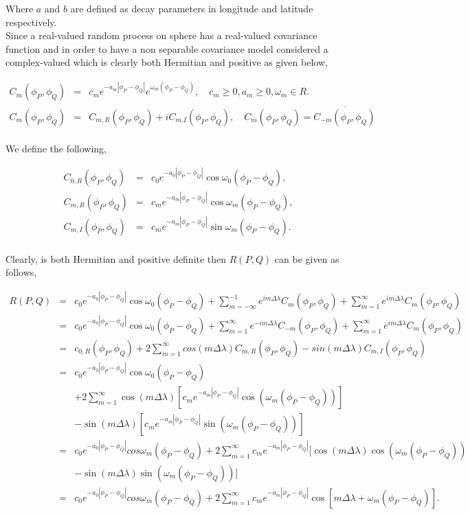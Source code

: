 	Where $a$ and $b$ are defined as decay parameters in longitude and latitude respectively. \\ 
		
	Since a real-valued random process on sphere has a real-valued covariance function and in order to have a non separable covariance model \cite{Huang2012} considered a complex-valued \Cm which is clearly both Hermitian and positive as given below,
		
	\begin{eqnarray*}
		C_m(\phi_P,\phi_Q) &=& c_m e^{-a_m|\phi_P-\phi_Q|}e^{\omega_m(\phi_P-\phi_Q)}, \quad c_m \ge 0,a_m\ge0,\omega_m\in R. \\
		C_m(\phi_P,\phi_Q) &=& C_{m,R}(\phi_P,\phi_Q)+iC_{m.I}(\phi_P,\phi_Q), \quad C_m(\phi_P,\phi_Q) = \overline{C_{-m}(\phi_P,\phi_Q)} 
	\end{eqnarray*}\\
		
	We define the following, 
	
	\begin{eqnarray*}
		C_{0,R}(\phi_P,\phi_Q) &=& c_0e^{-a_0|\phi_P-\phi_Q|}\cos\omega_0(\phi_P-\phi_Q), \\
		C_{m,R}(\phi_P,\phi_Q) &=& c_me^{-a_m|\phi_P-\phi_Q|}\cos\omega_m(\phi_P-\phi_Q), \\
		C_{m,I}(\phi_P,\phi_Q) &=& c_me^{-a_m|\phi_P-\phi_Q|}\sin\omega_m(\phi_P-\phi_Q). \\
	\end{eqnarray*}
	
	Clearly, \Cm is both Hermitian and positive definite then $R(P,Q)$ can be given as follows,
		
	\begin{eqnarray*}
		R(P,Q) &=& c_0e^{-a_0|\phi_P-\phi_Q|}\cos\omega_0(\phi_P-\phi_Q) + \sum_{m=-\infty}^{-1} e^{im\Delta\lambda}C_m(\phi_P,\phi_Q) + \sum_{m=1}^{\infty} e^{im\Delta\lambda}C_m(\phi_P,\phi_Q) \\
		&=& c_0e^{-a_0|\phi_P-\phi_Q|}\cos\omega_0(\phi_P-\phi_Q) + \sum_{m=1}^{\infty} e^{-im\Delta\lambda}C_{-m}(\phi_P,\phi_Q) + \sum_{m=1}^{\infty} e^{im\Delta\lambda}C_m(\phi_P,\phi_Q) \\
		&=& c_{0,R}(\phi_P,\phi_Q)+2 \sum_{m=1}^{\infty}cos(m\Delta\lambda)C_{m,R}(\phi_P,\phi_Q)-sin(m\Delta\lambda)C_{m,I}(\phi_P,\phi_Q)\\
		&=& c_0e^{-a_0|\phi_P-\phi_Q|}\cos\omega_0(\phi_P-\phi_Q)\\
		& & +2\sum_{m=1}^{\infty}\cos(m\Delta\lambda)[c_me^{-a_m|\phi_P-\phi_Q|}\cos(\omega_m(\phi_P-\phi_Q))] \\
		& & -\sin(m\Delta\lambda)[c_me^{-a_m|\phi_P-\phi_Q|}\sin(\omega_m(\phi_P-\phi_Q))]\\
		&=&c_0e^{-a_0|\phi_P-\phi_Q|}cos\omega_m(\phi_P-\phi_Q)+2\sum_{m=1}^{\infty}c_me^{-a_m|\phi_P-\phi_Q|}[\cos(m\Delta\lambda)\cos(\omega_m(\phi_P-\phi_Q))\\
		& &-\sin(m\Delta\lambda)\sin(\omega_m(\phi_P-\phi_Q))]
		\\
		&=&c_0e^{-a_0|\phi_P-\phi_Q|}cos\omega_m(\phi_P-\phi_Q)+2\sum_{m=1}^{\infty}c_me^{-a_m|\phi_P-\phi_Q|}\cos[m\Delta\lambda+\omega_m(\phi_P-\phi_Q)].
	\end{eqnarray*}
	
